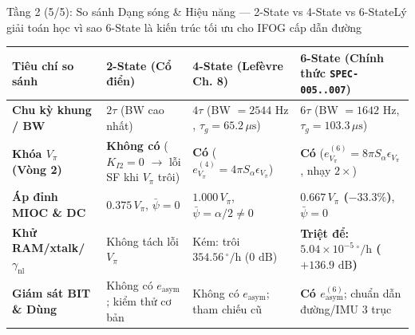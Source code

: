 \documentclass[aspectratio=169,8pt]{beamer}
\begin{document}
\begin{frame}{Tầng 2 (5/5): So sánh Dạng sóng \& Hiệu năng — 2-State vs 4-State vs 6-State}{Lý giải toán học vì sao 6-State là kiến trúc tối ưu cho IFOG cấp dẫn đường}
\vspace{0.05cm}
\scriptsize
\renewcommand{\arraystretch}{1.05}
\begin{tabularx}{\textwidth}{@{}p{2.75cm} >{\raggedright\arraybackslash}X >{\raggedright\arraybackslash}X >{\raggedright\arraybackslash}X@{}}
\toprule
\textbf{Tiêu chí so sánh} & \textbf{2-State (Cổ điển)} & \textbf{4-State (Lefèvre Ch. 8)} & \textbf{6-State (Chính thức \texttt{SPEC-005..007})} \\
\midrule
\textbf{Chu kỳ khung / BW} & $2\tau$ (BW cao nhất) & $4\tau$ (BW $= 2544\text{ Hz}$, $\tau_g=65.2\,\mu\text{s}$) & $6\tau$ (BW $= 1642\text{ Hz}$, $\tau_g=103.3\,\mu\text{s}$) \\
\textbf{Khóa $V_\pi$ (Vòng 2)} & \textcolor{AcadCrimson}{\textbf{Không có}} ($K_{I2}=0$ $\to$ lỗi SF khi $V_\pi$ trôi) & \textcolor{AcadTeal}{\textbf{Có}} ($e_{V_\pi}^{(4)} = 4\pi S_\alpha\epsilon_{V_\pi}$) & \textcolor{AcadTeal}{\textbf{Có}} ($e_{V_\pi}^{(6)} = 8\pi S_\alpha\epsilon_{V_\pi}$, nhạy $2\times$) \\
\textbf{Áp đỉnh MIOC \& DC} & $0.375\,V_\pi$, $\bar{\psi}=0$ & \textcolor{AcadCrimson}{$1.000\,V_\pi$}, \textcolor{AcadCrimson}{$\bar{\psi}=\alpha/2\ne 0$} & \textcolor{AcadTeal}{\textbf{$0.667\,V_\pi$ ($-33.3\%$)}}, \textcolor{AcadTeal}{\textbf{$\bar{\psi}=0$}} \\
\textbf{Khử RAM/xtalk/$\gamma_{\text{nl}}$} & Không tách lỗi $V_\pi$ & Kém: trôi $354.56\,^\circ/\text{h}$ ($0\text{ dB}$) & \textcolor{AcadTeal}{\textbf{Triệt để: $5.04{\times}10^{-5}\,^\circ/\text{h}$ ($+136.9\text{ dB}$)}} \\
\textbf{Giám sát BIT \& Dùng} & Không có $e_{\text{asym}}$; kiểm thử cơ bản & Không có $e_{\text{asym}}$; tham chiếu cũ & \textcolor{AcadTeal}{\textbf{Có $e_{\text{asym}}^{(6)}$}}; chuẩn dẫn đường/IMU 3 trục \\
\bottomrule
\end{tabularx}
\end{frame}
\end{document}
